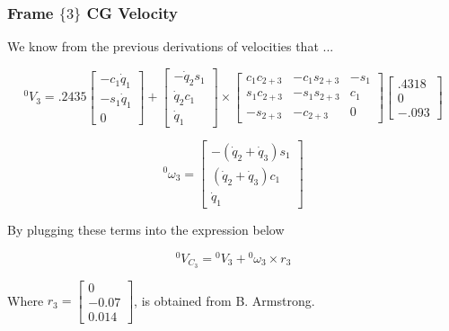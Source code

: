 \subsubsection*{Frame $\{ 3 \}$ CG Velocity}

We know from the previous derivations of velocities that ...

$$
{}^{0}V_{3} = .2435 \begin{bmatrix} -c_1\dot{q}_1 \\ -s_1\dot{q}_1 \\ 0\end{bmatrix} + \left[\begin{array}{c} -\dot{q}_{2}s_{1} \\ \dot{q}_{2}c_{1} \\ \dot{q}_{1}
\end{array}\right] \times \left[\begin{array}{ccc}
c_{1} c_{2+3} & -c_{1} s_{2+3} & -s_{1} \\
s_{1} c_{2+3} & -s_{1} s_{2+3} & c_{1} \\
-s_{2+3} & -c_{2+3} & 0
\end{array}\right] \begin{bmatrix} .4318 \\ 0 \\ -.093 \end{bmatrix}
$$


$$
{}^{0}\omega_3 = \begin{bmatrix}
-(\dot{q}_2 + \dot{q}_3)s_1 \\
(\dot{q}_2 + \dot{q}_3)c_1 \\
\dot{q}_1
\end{bmatrix}
$$


\noindent By plugging these terms into the expression below

$$
{}^{0}V_{C_{3}} = {}^{0}V_{3} + {}^{0}\omega_3 \times r_3
$$


\noindent Where $r_3 = \begin{bmatrix}
0 \\ -0.07 \\ 0.014
\end{bmatrix}
$, is obtained from B. Armstrong.



